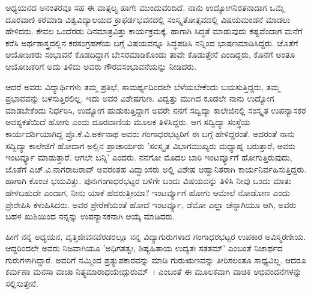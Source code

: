 ಅಧ್ಯಯನದ ಅನಂತರವೂ ಸಹ ಈ ವಾತ್ಸಲ್ಯ ಹಾಗೇ ಮುಂದುವರಿದಿದೆ. ನಾನು ಉದ್ಯೋಗನಿರತನಾದಾಗ ಒಮ್ಮೆ ದೂರವಾಣಿ ಕರೆಮಾಡಿ ವಿಶ್ವವಿದ್ಯಾಲಯದ ಕ್ರಾಫರ್ಡಭವನದಲ್ಲಿ ಸಂಸ್ಕೃತೋತ್ಸವದಲ್ಲಿ ವಿಷಯಮಂಡನೆ ಮಾಡಲು ಹೇಳಿದರು. ಕೇವಲ ಒಂದೆರಡು ದಿನಮಾತ್ರವಿತ್ತು ಕಾರ್ಯಕ್ರಮಕ್ಕೆ. ಹಾಗಾಗಿ ಸಿದ್ಧತೆ ಮಾಡುವುದು ಕಷ್ಟವೆಂದಾಗ ಮನೆಗೆ ಕರೆಸಿ ಅರ್ಥಶಾಸ್ತ್ರದಲ್ಲಿನ ಕರಸಂಗ್ರಹಣೆಯ ಬಗ್ಗೆ ವಿಷಯವನ್ನೂ ಸಿದ್ಧಪಡಿಸಿ ನನ್ನಿಂದ ಭಾಷಣಮಾಡಿಸಿದ್ದರು. ಜೊತೆಗೆ ಆಯೋಜಕರು ಸಂಭಾವನೆ ಕೊಡದಿದ್ದಾಗ ಬೇಸರಮಾಡಿಕೊಂಡು ತಾವೇ ಕೊಡುತ್ತೇನೆ ಎಂದಿದ್ದರು, ಕೊನೆಗೆ ಅಂತೂ ಆಯೋಜಕರಿಗೆ ಅದು ತಿಳಿದು ಅವರು ಗೌರವಸಂಭಾವನೆಯನ್ನು ನೀಡಿದರು.

ಆದರೆ ಅವರು ವಿದ್ಯಾರ್ಥಿಗಳು ತಮ್ಮ ಪ್ರತಿಭೆ, ಸಾಮರ್ಥ್ಯದಿಂದಲೇ ಬೆಳೆಯಬೇಕೆಂದು ಬಯಸುತ್ತಿದ್ದರು, ತಮ್ಮ ಪ್ರಭಾವವನ್ನು ಬಳಸುತ್ತಿರಲಿಲ್ಲ. ಇದು ಅವರ ವಿಶೇಷಗುಣ. ವಿದ್ವತ್ತು ಮುಗಿದ ಕೂಡಲೇ ನಾನು ಉದ್ಯೋಗ ಮಾಡಬೇಕೆಂದು ನಿರ್ಧರಿಸಿ, ಉದ್ಯೋಗ ಹುಡುಕುತ್ತಿದ್ದಾಗ ಅವರೇ ನನಗೆ ಸದ್ವಿದ್ಯಾ ಕಾಲೇಜಿನಲ್ಲಿ ಸಂಸ್ಕೃತ ಉಪನ್ಯಾಸಕರ ಅವಶ್ಯಕತೆಯಿದೆ ಹೋಗು ಎಂದು ದೂರವಾಣಿಯ ಮೂಲಕ ತಿಳಿಸಿದ್ದರು. ಆಗ ಸದ್ವಿದ್ಯಾ ಸಂಸ್ಥೆಯ ಕಾರ್ಯದರ್ಶಿಯಾಗಿದ್ದ ಪ್ರೊ.ಕೆ.ವಿ.ಅರ್ಕನಾಥ ಅವರು ಗಂಗಾಧರಭಟ್ಟರಿಗೆ ಈ ಬಗ್ಗೆ ಹೇಳಿದ್ದರಂತೆ. ಅದರಂತೆ ನಾನು ಸದ್ವಿದ್ಯಾ ಕಾಲೇಜಿಗೆ ಹೋದಾಗ ಅಲ್ಲಿನ ಪ್ರಾಚಾರ್ಯರು ’ಸಂಸ್ಕೃತ ವಿಭಾಗಮುಖ್ಯರು ಮಧ್ಯಾಹ್ನ ಬರುತ್ತಾರೆ, ಅವರು ಇಂಟರ್ವ್ಯೂ ಮಾಡುತ್ತಾರೆ. ಆಗಲೇ ಬನ್ನಿ’ ಎಂದರು. ನನಗೋ ಮೊದಲ ಬಾರಿ ಇಂಟರ್ವ್ಯೂಗೆ ಹೋಗುತ್ತಿರುವುದು, ಜೊತೆಗೆ ಎಚ್.ವಿ.ನಾಗರಾಜರಾವ್ ಅವರಂತಹ ವಿದ್ವಾಂಸರು ಅಲ್ಲಿ ವಿಶೇಷ ಆಹ್ವಾನಿತರಾಗಿ ಕಾರ್ಯನಿರ್ವಹಿಸುತ್ತಿದ್ದರು. ಹಾಗಾಗಿ ಕೊಂಚ ಭಯವಿತ್ತು. ಪುನಃಗಂಗಾಧರಭಟ್ಟರ ಬಳಿಗೇ ಬಂದು ವಿಷಯವನ್ನು ತಿಳಿಸಿ ನೀವು ಒಂದು ಮಾತು ಹೇಳಬಹುದೇ ಎಂದಾಗ, ನೀನು ಯಾಕೆ ಹೆದರುತ್ತೀಯಾ? ಇಂಟರ್ವ್ಯೂಗೆ ಹೋಗು ಆಮೇಲೆ ನೋಡೋಣ ಎಂದು ಪ್ರೇರೇಪಿಸಿ ಕಳುಹಿಸಿದರು. ಅವರ ಪ್ರೇರೆಣೆಯಂತೆ ಹೋದೆ ಇಂಟರ್ವ್ಯೂ, ಡೆಮೋ ಎಲ್ಲಾ ಚೆನ್ನಾಗಿಯೂ ಆಗಿ, ಅವರು ಬಹಳ ಖುಶಿಯಿಂದ ನನ್ನನ್ನು ಉಪನ್ಯಾಸಕನಾಗಿ ಆಯ್ಕೆ ಮಾಡಿದರು.

ಹೀಗೆ ನನ್ನ ಅಧ್ಯಯನ, ವೃತ್ತಿಜೀವನವೆರಡರಲ್ಲೂ ನನ್ನ ವಿದ್ಯಾಗುರುಗಳಾದ ಗಂಗಾಧರಭಟ್ಟರ ಉಪಕಾರ ಅವಿಸ್ಮರಣೀಯ. ಆದ್ದರಿಂದಲೇ ಅವರು ನಿಜವಾಗಿಯೂ ’ಅಧಿಗತತ್ವಃ, ಶಿಷ್ಯಹಿತಾಯ ಉದ್ಯತಃ ಸತತಮ್’ ಎಂಬಂತೆ ನಿಜಾರ್ಥದ ಗುರುಗಳಾಗಿದ್ದಾರೆ. ಅವರಿಗೆ ನಮ್ಮಿಂದ ಪ್ರತ್ಯುಪಕಾರವನ್ನು ಮಾಡಿ ಗುರುಋಣವನ್ನು ತೀರಿಸಲಂತೂ ಸಾಧ್ಯವಿಲ್ಲ. ಆದರೂ ಕರ್ಮಣಾ ಮನಸಾ ವಾಚಾ ನಿತ್ಯಮಾರಾಧಯೇದ್ಗುರುಮ್~। ಎಂಬಂತೆ ಈ ಮೂಲಕವಾಗಿ ವಾಚಿಕ ಅಭಿವಂದನೆಗಳನ್ನು ಸಲ್ಲಿಸುತ್ತೇನೆ.

\articleend

